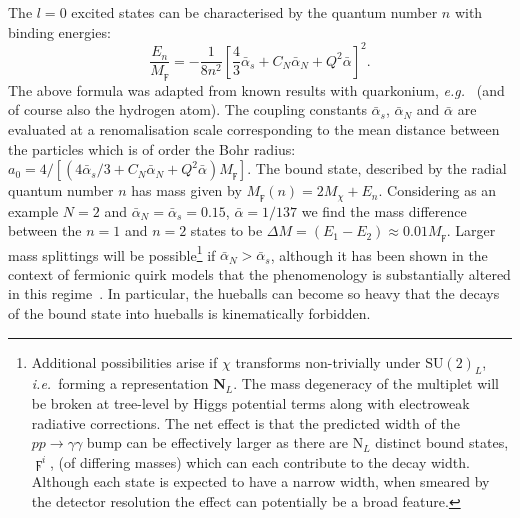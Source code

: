 The $l=0$ excited states can be characterised by the quantum number $n$ with
binding energies:
\begin{equation}
  \frac{E_n}{M_\digamma} = - \frac{1}{8n^2} \left[ \frac{4}{3} \bar{\alpha}_{s} + C_{N} \bar{\alpha}_{N} + Q^2 \bar{\alpha} \right]^2.
  \label{eq:8y}
\end{equation}
The above formula was adapted from known results with quarkonium, \textit{e.g.}\
\cite{Kats:2016kuz} (and of course also the hydrogen atom). The coupling
constants $\bar{\alpha}_{s}$, $\bar{\alpha}_{N}$ and $\bar{\alpha}$ are
evaluated at a renomalisation scale corresponding to the mean distance between
the particles which is of order the Bohr radius:
$a_0 = 4/[(4\bar{\alpha}_{s}/3 + C_{N}\bar{\alpha}_{N} + Q^2 \bar{\alpha})M_\digamma]$.
The bound state, described by the radial quantum number $n$ has mass given by
$M_\digamma(n) = 2M_\chi + E_n$. Considering as an example $N=2$ and
$\bar{\alpha}_{N} = \bar{\alpha}_{s} = 0.15$, $\bar{\alpha} = 1/137$ we find the
mass difference between the $n=1$ and $n=2$ states to be
$\Delta M = (E_1-E_2) \approx 0.01 M_\digamma$. Larger mass splittings will be
possible\footnote{Additional possibilities arise if $\chi$ transforms
  non-trivially under $\mathrm{SU}(2)_{L}$, \textit{i.e.}\ forming a
  representation $\mathbf{N}_{L}$. The mass degeneracy of the multiplet will be
  broken at tree-level by Higgs potential terms along with electroweak radiative
  corrections. The net effect is that the predicted width of the
  $pp \rightarrow \gamma \gamma$ bump can be effectively larger as there are
  $\mathrm{N}_{L}$ distinct bound states, $\digamma^i$, (of differing masses) which
  can each contribute to the decay width. Although each state is expected to
  have a narrow width, when smeared by the detector resolution the effect can
  potentially be a broad feature.} if $\bar{\alpha}_{N} > \bar{\alpha}_{s}$,
although it has been shown in the context of fermionic quirk models that the
phenomenology is substantially altered in this regime~\cite{Curtin:2015jcv}. In
particular, the hueballs can become so heavy that the decays of the bound state
into hueballs is kinematically forbidden.

